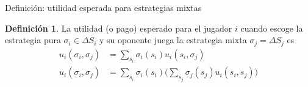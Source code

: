\documentclass[12pt]{scrartcl}
\theoremstyle{definition}
\newtheorem{defi}{Definición}[section]
\begin{document}
\begin{mybox}{Definición: utilidad esperada para estrategias mixtas}
    \begin{defi}
        La utilidad (o pago) esperado para el jugador $i$ cuando escoge la estrategia pura $\sigma_i \in \Delta S_i$ y su oponente juega la estrategia mixta $\sigma_{j} = \Delta S_{j}$ es
        \begin{align*}
            u_i(\sigma_i, \sigma_{j}) &= \sum_{s_{i}} \sigma_{i}(s_{i})u_i(s_i,\sigma_{j}) \\
            u_i(\sigma_i, \sigma_{j}) &= \sum_{s_{i}} \sigma_i(s_i)\Bigg ( \sum_{s_{j}} \sigma_{j}(s_{j})u_i(s_i,s_{j}) \Bigg )
        \end{align*} 
    \end{defi}
\end{mybox}
\end{document}
